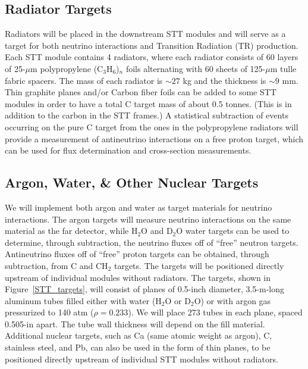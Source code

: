 \subsection{Radiator Targets}

Radiators will be placed in the downstream STT modules
and will serve as a target for both neutrino interactions 
and Transition Radiation (TR) production. Each STT module contains 
4 radiators, where each radiator consists of
60 layers of 25-$\mu$m polypropylene (C$_3$H$_6$)$_n$ 
foils alternating with 60 sheets of 125-$\mu$m tulle fabric spacers. 
The mass of each radiator is $\sim 27$ kg and the thickness is 
$\sim 9$ mm. %
Thin graphite planes and/or Carbon fiber foils can be added to some STT modules
in order to have a total C target mass of about 0.5 tonnes. (This is in addition to
the carbon in the STT frames.) A statistical subtraction of events occurring
on the pure C target from the ones in the polypropylene radiators will provide a measurement of
antineutrino interactions on a free proton target, which can be used for flux determination and cross-section
measurements.

\subsection{Argon, Water, \& Other Nuclear Targets}

We will implement both argon
and water as target materials for neutrino interactions.
The argon targets will measure neutrino interactions on the same material as the far detector, while
H$_2$O and D$_2$O water targets can be used to determine, through subtraction, the
neutrino fluxes off of ``free'' neutron targets. Antineutrino fluxes off of ``free''
proton targets can be obtained, through subtraction, from C and CH$_2$ targets.
The targets will be 
positioned directly upstream of individual modules without radiators. 
The targets, shown in 
Figure~\ref{STT_targets}, will consist of planes of 0.5-inch diameter, 3.5-m-long aluminum tubes filled
either with water (H$_2$O or D$_2$O) or with argon gas pressurized to 140 atm ($\rho = 0.233$). 
We will place 273 tubes in each 
plane, spaced 0.505-in apart. The tube wall thickness will depend on the fill material.
Additional nuclear targets, such as Ca (same atomic weight as argon), C, stainless
steel, and Pb, can also be used in
the form of thin planes, to be positioned directly upstream of individual STT modules without radiators.

